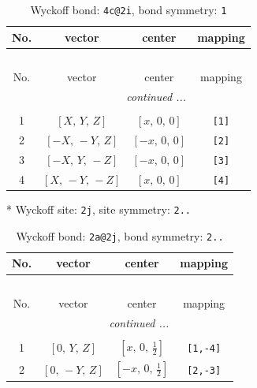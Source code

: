 \documentclass[fleqn,8pt]{jsarticle}
\begin{document}
\begin{longtable}{cccc}
\caption{Wyckoff bond: {\tt 4c@2i}, bond symmetry: {\tt 1}}
 \\
 \hline \hline
No. & vector & center & mapping \\ \hline \endfirsthead

\multicolumn{3}{l}{\tablename\ \thetable{}} \\
 \hline \hline
No. & vector & center & mapping \\ \hline \endhead

 \hline \hline
\multicolumn{3}{r}{\footnotesize\it continued ...} \\ \endfoot

 \hline \hline
\multicolumn{3}{r}{} \\ \endlastfoot

1 & $\left[ X,\, Y,\, Z \right]$ & $\left[ x,\, 0,\, 0 \right]$ & {\tt [1]} \\ \hline
2 & $\left[ - X,\, - Y,\, Z \right]$ & $\left[ - x,\, 0,\, 0 \right]$ & {\tt [2]} \\ \hline
3 & $\left[ - X,\, Y,\, - Z \right]$ & $\left[ - x,\, 0,\, 0 \right]$ & {\tt [3]} \\ \hline
4 & $\left[ X,\, - Y,\, - Z \right]$ & $\left[ x,\, 0,\, 0 \right]$ & {\tt [4]} \\
\end{longtable}
* Wyckoff site: {\tt 2j}, site symmetry: {\tt 2..}
\renewcommand{\arraystretch}{1.2}
\begin{longtable}{cccc}
\caption{Wyckoff bond: {\tt 2a@2j}, bond symmetry: {\tt 2..}}
 \\
 \hline \hline
No. & vector & center & mapping \\ \hline \endfirsthead

\multicolumn{3}{l}{\tablename\ \thetable{}} \\
 \hline \hline
No. & vector & center & mapping \\ \hline \endhead

 \hline \hline
\multicolumn{3}{r}{\footnotesize\it continued ...} \\ \endfoot

 \hline \hline
\multicolumn{3}{r}{} \\ \endlastfoot

1 & $\left[ 0,\, Y,\, Z \right]$ & $\left[ x,\, 0,\, \frac{1}{2} \right]$ & {\tt [1,-4]} \\ \hline
2 & $\left[ 0,\, - Y,\, Z \right]$ & $\left[ - x,\, 0,\, \frac{1}{2} \right]$ & {\tt [2,-3]} \\
\end{longtable}
\end{document}
